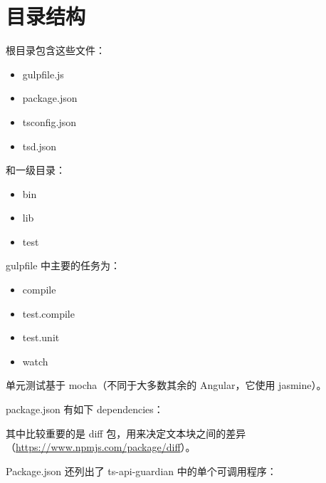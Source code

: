 \section{目录结构}


根目录包含这些文件：

\begin{itemize}
  \item gulpfile.js
  \item package.json
  \item tsconfig.json
  \item tsd.json
\end{itemize}


和一级目录：

\begin{itemize}
  \item bin
  \item lib
  \item test
\end{itemize}


gulpfile 中主要的任务为：

\begin{itemize}
  \item compile
  \item test.compile
  \item test.unit
  \item watch
\end{itemize}


单元测试基于 mocha（不同于大多数其余的 Angular，它使用 jasmine）。


package.json 有如下 dependencies：




其中比较重要的是 diff 包，用来决定文本块之间的差异（\url{https://www.npmjs.com/package/diff}）。


Package.json 还列出了 ts-api-guardian 中的单个可调用程序：


